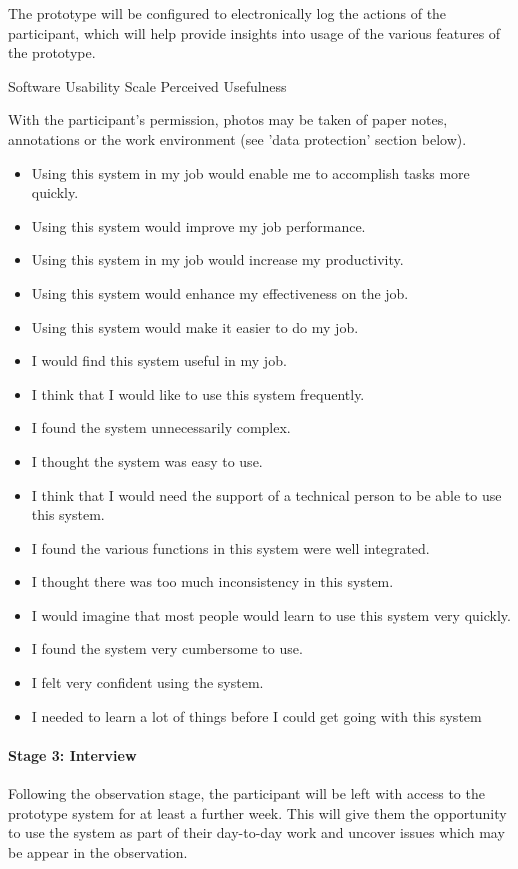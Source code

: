 The prototype will be configured to electronically log the actions of the participant, which will help provide insights
into usage of the various features of the prototype.

Software Usability Scale \citep{Brooke1996}
Perceived Usefulness \citep{Davis1989}

With the participant's permission, photos may be taken of paper notes, annotations or the work environment (see 'data
protection' section below).
{\singlespacing \begin{itemize} \item Using this system in my job would enable me to accomplish tasks more quickly.
  \item Using this system would improve my job performance.
  \item Using this system in my job would increase my productivity.
  \item Using this system would enhance my effectiveness on the job.
  \item Using this system would make it easier to do my job.
\end{itemize}
}

{\singlespacing
\begin{itemize}
  \item I would find this system useful in my job.
  \item I think that I would like to use this system frequently.
  \item I found the system unnecessarily complex.
  \item I thought the system was easy to use.
  \item I think that I would need the support of a technical person to be able to use this system.
  \item I found the various functions in this system were well integrated.
  \item I thought there was too much inconsistency in this system.
  \item I would imagine that most people would learn to use this system very quickly.
  \item I found the system very cumbersome to use.
  \item I felt very confident using the system.
  \item I needed to learn a lot of things before I could get going with this system
\end{itemize}
}

\paragraph{Stage 3: Interview}
Following the observation stage, the participant will be left with access to the prototype system for at least a
further week. This will give them the opportunity to use the system as part of their day-to-day work and uncover issues
which may be appear in the observation.

